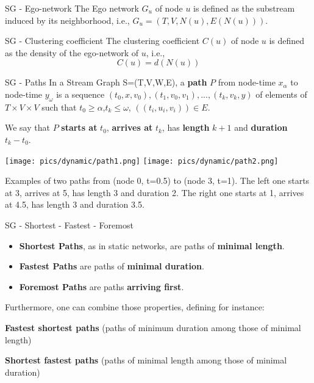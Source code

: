 \begin{textbox}{SG - Ego-network}
    The Ego network $G_u$ of node $u$ is defined as the substream induced by its neighborhood, i.e., $G_u=(T,V,N(u),E(N(u)))$.
\end{textbox}


\begin{textbox}{SG - Clustering coefficient}
    The clustering coefficient $C(u)$ of node $u$ is defined as the density of the ego-network of $u$, i.e.,
    \[
        C(u)=d(N(u))
    \]
\end{textbox}


\begin{textbox}{SG - Paths}
    In a Stream Graph S=(T,V,W,E), a \textbf{path} $P$ from node-time $x_\alpha$ to node-time $y_\omega$ is a sequence $(t_0,x,v_0),(t_1,v_0,v_1),...,(t_k,v_k,y)$ of elements of $T \times V \times V$ such that $t_0\geq \alpha$,$t_k\leq\omega$, $((t_i,u_i,v_i))\in E$.

    We say that $P$ \textbf{starts at} $t_0$, \textbf{arrives at} $t_k$, has \textbf{length} $k+1$ and \textbf{duration} $t_k-t_0$.

    \centering
    \colorbox{white}{\texttt{[image: pics/dynamic/path1.png]}}
    \colorbox{white}{\texttt{[image: pics/dynamic/path2.png]}}

    Examples of two paths from (node 0, t=0.5) to (node 3, t=1). The left one starts at 3, arrives at 5, has length 3 and duration 2. The right one starts at 1, arrives at 4.5, has length 3 and duration 3.5.
\end{textbox}


\begin{textbox}{SG - Shortest - Fastest - Foremost}
    \begin{itemize}
        \item \textbf{Shortest Paths}, as in static networks, are paths of \textbf{minimal length}.
        \item \textbf{Fastest Paths} are paths of \textbf{minimal duration}.
        \item \textbf{Foremost Paths} are paths \textbf{arriving first}.
    \end{itemize}

    Furthermore, one can combine those properties, defining for instance:

    \textbf{Fastest shortest paths} (paths of minimum duration among those of minimal length)

    \textbf{Shortest fastest paths} (paths of minimal length among those of minimal duration)
\end{textbox}



